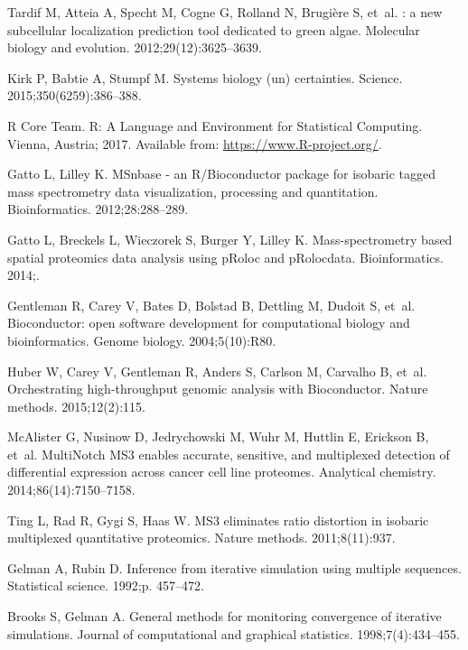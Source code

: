\documentclass[10pt,letterpaper]{article}\usepackage[]{graphicx}\usepackage[]{color}
\begin{document}
\begin{thebibliography}{10}
Tardif M, Atteia A, Specht M, Cogne G, Rolland N, Brugi{\`e}re S, et~al.
: a new subcellular localization prediction tool dedicated
  to green algae.
\newblock Molecular biology and evolution. 2012;29(12):3625--3639.

Kirk P, Babtie A, Stumpf M.
\newblock Systems biology (un) certainties.
\newblock Science. 2015;350(6259):386--388.

{R Core Team}. R: A Language and Environment for Statistical Computing. Vienna,
  Austria; 2017.
\newblock Available from: \url{https://www.R-project.org/}.

Gatto L, Lilley K.
\newblock MSnbase - an R/Bioconductor package for isobaric tagged mass
  spectrometry data visualization, processing and quantitation.
\newblock Bioinformatics. 2012;28:288--289.

Gatto L, Breckels L, Wieczorek S, Burger Y, Lilley K.
\newblock Mass-spectrometry based spatial proteomics data analysis using pRoloc
  and pRolocdata.
\newblock Bioinformatics. 2014;.

Gentleman R, Carey V, Bates D, Bolstad B, Dettling M, Dudoit S, et~al.
\newblock Bioconductor: open software development for computational biology and
  bioinformatics.
\newblock Genome biology. 2004;5(10):R80.

Huber W, Carey V, Gentleman R, Anders S, Carlson M, Carvalho B, et~al.
\newblock Orchestrating high-throughput genomic analysis with Bioconductor.
\newblock Nature methods. 2015;12(2):115.

McAlister G, Nusinow D, Jedrychowski M, W{\:u}hr M, Huttlin E, Erickson B, et~al.
\newblock MultiNotch MS3 enables accurate, sensitive, and multiplexed detection
  of differential expression across cancer cell line proteomes.
\newblock Analytical chemistry. 2014;86(14):7150--7158.

Ting L, Rad R, Gygi S, Haas W.
\newblock MS3 eliminates ratio distortion in isobaric multiplexed quantitative
  proteomics.
\newblock Nature methods. 2011;8(11):937.

Gelman A, Rubin D.
\newblock Inference from iterative simulation using multiple sequences.
\newblock Statistical science. 1992;p. 457--472.

Brooks S, Gelman A.
\newblock General methods for monitoring convergence of iterative simulations.
\newblock Journal of computational and graphical statistics.
  1998;7(4):434--455.


\end{thebibliography}
\end{document}
